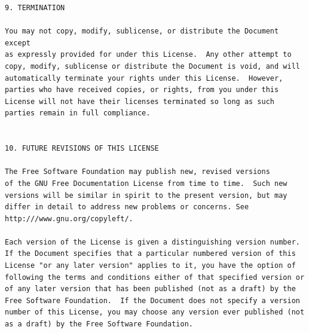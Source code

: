 \documentclass[12pt]{report}
\begin{document}
\begin{verbatim}
9. TERMINATION

You may not copy, modify, sublicense, or distribute the Document except
as expressly provided for under this License.  Any other attempt to
copy, modify, sublicense or distribute the Document is void, and will
automatically terminate your rights under this License.  However,
parties who have received copies, or rights, from you under this
License will not have their licenses terminated so long as such
parties remain in full compliance.


10. FUTURE REVISIONS OF THIS LICENSE

The Free Software Foundation may publish new, revised versions
of the GNU Free Documentation License from time to time.  Such new
versions will be similar in spirit to the present version, but may
differ in detail to address new problems or concerns. See
http:///www.gnu.org/copyleft/.

Each version of the License is given a distinguishing version number.
If the Document specifies that a particular numbered version of this
License "or any later version" applies to it, you have the option of
following the terms and conditions either of that specified version or
of any later version that has been published (not as a draft) by the
Free Software Foundation.  If the Document does not specify a version
number of this License, you may choose any version ever published (not
as a draft) by the Free Software Foundation.


\end{verbatim}
\end{document}
